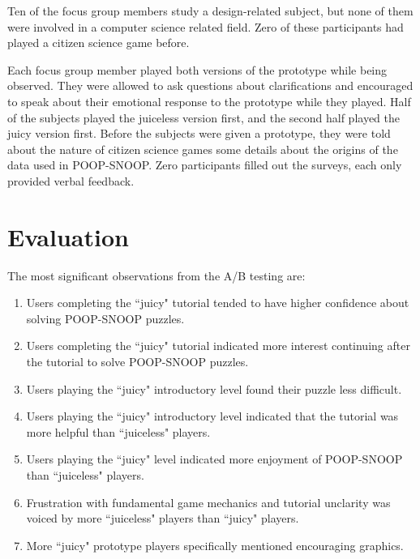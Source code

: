 Ten of the focus group members study a design-related subject, but none of them were involved in a computer science related field. Zero of these participants had played a citizen science game before.

Each focus group member played both versions of the prototype while being observed. They were allowed to ask questions about clarifications and encouraged to speak about their emotional response to the prototype while they played. Half of the subjects played the juiceless version first, and the second half played the juicy version first. Before the subjects were given a prototype, they were told about the nature of citizen science games some details about the origins of the data used in POOP-SNOOP. Zero participants filled out the surveys, each only provided verbal feedback.

\section{Evaluation}

The most significant observations from the A/B testing are:

\begin{enumerate}

\item Users completing the ``juicy" tutorial tended to have higher confidence about solving POOP-SNOOP puzzles.

\item Users completing the ``juicy" tutorial indicated more interest continuing after the tutorial to solve POOP-SNOOP puzzles.

\item Users playing the ``juicy" introductory level found their puzzle less difficult.

\item Users playing the ``juicy" introductory level indicated that the tutorial was more helpful than ``juiceless" players.

\item Users playing the ``juicy" level indicated more enjoyment of POOP-SNOOP than ``juiceless" players. 

\item Frustration with fundamental game mechanics and tutorial unclarity was voiced by more ``juiceless" players than ``juicy" players.

\item More ``juicy" prototype players specifically mentioned encouraging graphics.

\end{enumerate}

